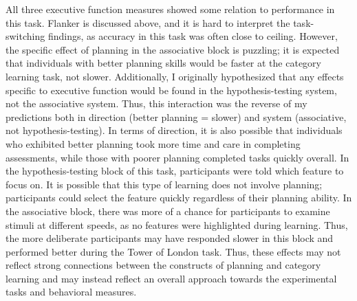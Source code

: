 \documentclass[../dissertation.tex]{subfiles}
\begin{document}
	All three executive function measures showed some relation to performance in this task. Flanker is discussed above, and it is hard to interpret the task-switching findings, as accuracy in this task was often close to ceiling. However, the specific effect of planning in the associative block is puzzling; it is expected that individuals with better planning skills would be faster at the category learning task, not slower. Additionally, I originally hypothesized that any effects specific to executive function would be found in the hypothesis-testing system, not the associative system. Thus, this interaction was the reverse of my predictions both in direction (better planning = slower) and system (associative, not hypothesis-testing). In terms of direction, it is also possible that individuals who exhibited better planning took more time and care in completing assessments, while those with poorer planning completed tasks quickly overall. In the hypothesis-testing block of this task, participants were told which feature to focus on. It is possible that this type of learning does not involve planning; participants could select the feature quickly regardless of their planning ability. In the associative block, there was more of a chance for participants to examine stimuli at different speeds, as no features were highlighted during learning. Thus, the more deliberate participants may have responded slower in this block and performed better during the Tower of London task. Thus, these effects may not reflect strong connections between the constructs of planning and category learning and may instead reflect an overall approach towards the experimental tasks and behavioral measures. \par
	
\end{document}
